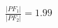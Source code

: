 \documentclass[preview]{standalone}
\begin{document}
\begin{align*}
\frac{|PF_1|}{|PF_2|} = 1.99
\end{align*}
\end{document}
